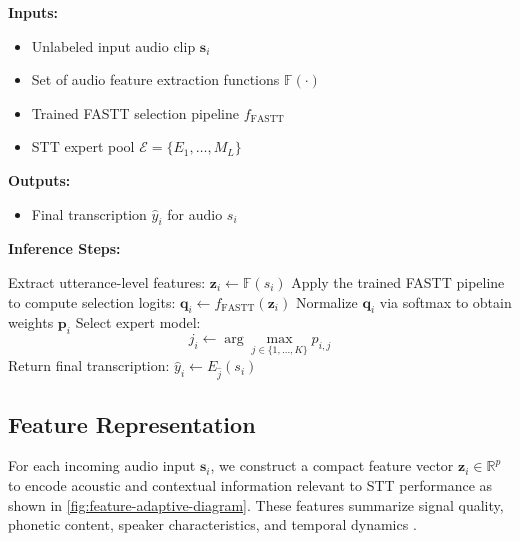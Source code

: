 \documentclass[journal]{IEEEtran}
\begin{document}
    \begin{algorithm}
        [t] \small
        \caption{\small Online STT Model Selection via FASTT }
        \label{alg:fa-online-overview}

        \textbf{Inputs:}
        \begin{itemize}
            \item Unlabeled input audio clip $\mathbf{s}_i$

            \item Set of audio feature extraction functions $\mathbb{F}(\cdot)$

            \item Trained FASTT selection pipeline $f_{\text{FASTT}}$

            \item STT expert pool $\mathcal{E}=\{E_{1},\dots,M_{L}\}$
        \end{itemize}

        \textbf{Outputs:}
        \begin{itemize}
            \item Final transcription $\widehat{y}_{i}$ for audio $s_{i}$
        \end{itemize}

        \textbf{Inference Steps:}
        \begin{algorithmic}
            [1] \State Extract utterance-level features:
            $\mathbf{z}_{i}\leftarrow \mathbb{F}(s_{i})$ \State Apply the trained FASTT
            pipeline to compute selection logits:
            $\mathbf{q}_{i}\leftarrow f_{\text{FASTT}}(\mathbf{z}_{i})$ \State Normalize
            $\mathbf{q}_{i}$ via softmax to obtain weights $\mathbf{p}_{i}$
            \State Select expert model:
            \[
                j_{i}\leftarrow \arg\max_{j \in \{1,\dots,K\}}p_{i,j}
            \]
            \State Return final transcription:
            $\hat{y}_{i}\leftarrow E_{\hat{j}}(s_{i})$
        \end{algorithmic}
    \end{algorithm}

    \subsection{Feature Representation}
    \label{sec:features}

    For each incoming audio input $\mathbf{s}_i$, we construct a compact feature vector
    $\mathbf{z}_{i}\in \mathbb{R}^{p}$ to encode acoustic and contextual information
    relevant to STT performance as shown in \cref{fig:feature-adaptive-diagram}.
    These features summarize signal quality, phonetic content, speaker
    characteristics, and temporal dynamics \cite{rabiner1993fundamentals,li2023emotionalasr}.
\end{document}
